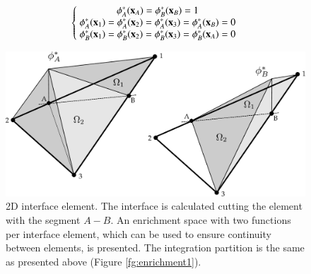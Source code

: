 \begin{equation}
   \left\{\;
   \begin{matrix}
     \phi_A^*(\mathbf{x}_A)=\phi_B^*(\mathbf{x}_B)=1 \\
     \phi_A^*(\mathbf{x}_1)=\phi_A^*(\mathbf{x}_2)=\phi_A^*(\mathbf{x}_3)=\phi_A^*(\mathbf{x}_B)=0 \\
     \phi_B^*(\mathbf{x}_1)=\phi_B^*(\mathbf{x}_2)=\phi_B^*(\mathbf{x}_3)=\phi_B^*(\mathbf{x}_A)=0
   \end{matrix}\;
   \right.
   \label{eq:enrich-2a}
\end{equation}



\begin{figure}[H]
  \centering
   \includegraphics[width=.9\columnwidth]{images/enrichment2.pdf}
   \caption{2D interface element. The interface is calculated cutting the element with the segment $A-B$. An enrichment space with two functions per interface element, which can be used to ensure continuity between elements, is presented. The integration partition is the same as presented above (Figure \ref{fg:enrichment1}).}
   \label{fg:enrichment2}
\end{figure}


